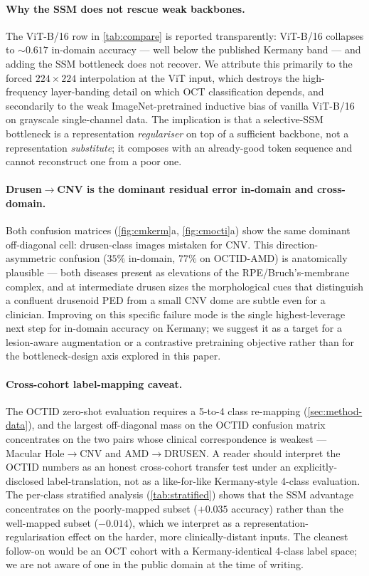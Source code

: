 \documentclass[5p]{elsarticle}
\begin{document}
\paragraph{Why the SSM does not rescue weak backbones.}
The ViT-B/16 row in \cref{tab:compare} is reported transparently: ViT-B/16 collapses to $\sim 0.617$ in-domain accuracy --- well below the published Kermany band --- and adding the SSM bottleneck does not recover. We attribute this primarily to the forced $224\times 224$ interpolation at the ViT input, which destroys the high-frequency layer-banding detail on which OCT classification depends, and secondarily to the weak ImageNet-pretrained inductive bias of vanilla ViT-B/16 on grayscale single-channel data. The implication is that a selective-SSM bottleneck is a representation \emph{regulariser} on top of a sufficient backbone, not a representation \emph{substitute}; it composes with an already-good token sequence and cannot reconstruct one from a poor one.

\paragraph{Drusen$\rightarrow$CNV is the dominant residual error in-domain and cross-domain.}
Both confusion matrices (\cref{fig:cmkerm}a, \cref{fig:cmocti}a) show the same dominant off-diagonal cell: drusen-class images mistaken for CNV. This direction-asymmetric confusion ($35\%$ in-domain, $77\%$ on OCTID-AMD) is anatomically plausible --- both diseases present as elevations of the RPE/Bruch's-membrane complex, and at intermediate drusen sizes the morphological cues that distinguish a confluent drusenoid PED from a small CNV dome are subtle even for a clinician. Improving on this specific failure mode is the single highest-leverage next step for in-domain accuracy on Kermany; we suggest it as a target for a lesion-aware augmentation or a contrastive pretraining objective rather than for the bottleneck-design axis explored in this paper.

\paragraph{Cross-cohort label-mapping caveat.}
The OCTID zero-shot evaluation requires a 5-to-4 class re-mapping (\cref{sec:method-data}), and the largest off-diagonal mass on the OCTID confusion matrix concentrates on the two pairs whose clinical correspondence is weakest --- Macular Hole$\to$CNV and AMD$\to$DRUSEN. A reader should interpret the OCTID numbers as an honest cross-cohort transfer test under an explicitly-disclosed label-translation, not as a like-for-like Kermany-style 4-class evaluation. The per-class stratified analysis (\cref{tab:stratified}) shows that the SSM advantage concentrates on the poorly-mapped subset ($+0.035$ accuracy) rather than the well-mapped subset ($-0.014$), which we interpret as a representation-regularisation effect on the harder, more clinically-distant inputs. The cleanest follow-on would be an OCT cohort with a Kermany-identical 4-class label space; we are not aware of one in the public domain at the time of writing.
\end{document}
